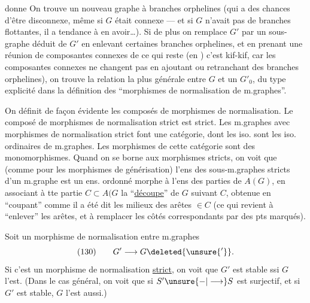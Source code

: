 donne
On trouve un nouveau graphe à branches orphelines (qui a des chances d'être disconnexe, même si $G$ était connexe \unsure{!|\}} — et si $G$ n'avait pas de branches flottantes, il a tendance à en avoir\ldots).
Si de plus on  remplace $G'$ par un sous-graphe déduit de $G'$ en enlevant certaines branches orphelines, et en prenant une réunion de composantes connexes de ce qui reste (en  ) c'est
kif-kif, car les composantes connexes ne changent pas en ajoutant ou retranchant des branches orphelines), on trouve la relation la plus générale entre $G$ et un $G'_0$, du type explicité dans la définition des ``morphismes de normalisation de m.graphes''.

On définit de façon évidente les composés de morphismes de normalisation. Le composé de morphismes de normalisation strict est strict. Les m.graphes avec morphismes de normalisation strict font une catégorie, dont les iso. sont les iso. ordinaires de m.graphes. Les morphismes de cette catégorie sont des monomorphismes. Quand on se borne aux morphismes  stricts, on voit que (comme pour les morphismes de générisation) l'ens des sous-m.graphes stricts d'un m.graphe  est un ens. ordonné morphe à l'ens des parties de $A(G)$, en associant à tte partie $C\subset A(G$
la ``\uline{découpe}'' de $G$ suivant $C$, obtenue en ``coupant'' comme il a été dit  les milieux des arêtes $\in C$ (ce qui revient à ``enlever'' les arêtes, et à remplacer les côtés correspondants par des pts marqués).

Soit un morphisme de normalisation entre m.graphes
\[
(130)\qquad G'\longrightarrow G\deleted{\unsure{'}}.
\]
Si c'est un morphisme de normalisation \uline{strict}, on voit que $G'$ est stable ssi $G$ l'est. (Dans le cas général, on voit que si $S'\unsure{-|\longrightarrow}S$ est surjectif, et si $G'$ est stable, $G$ l'est aussi.)


